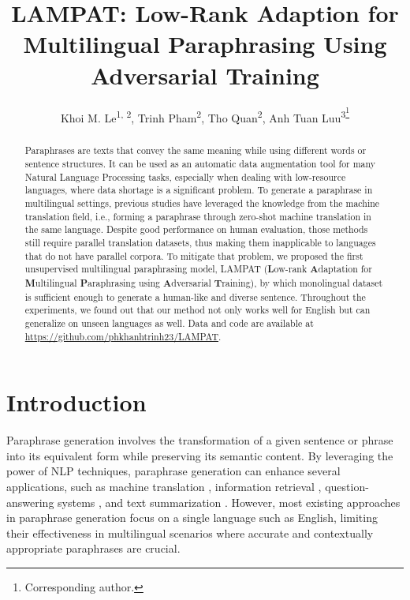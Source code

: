 \documentclass[letterpaper]{article} %
\title{LAMPAT: Low-Rank Adaption for Multilingual Paraphrasing Using Adversarial Training}
\author{
    Khoi M. Le\textsuperscript{\rm 1, \rm 2}\equalcontrib,
    Trinh Pham\textsuperscript{\rm 2}\equalcontrib,
    Tho Quan\textsuperscript{\rm 2},
    Anh Tuan Luu\textsuperscript{\rm 3\thanks{Corresponding author.}}
}
\begin{document}
\maketitle

\begin{abstract}
Paraphrases are texts that convey the same meaning while using different words or sentence structures. It can be used as an automatic data augmentation tool for many Natural Language Processing tasks, especially when dealing with low-resource languages, where data shortage is a significant problem. To generate a paraphrase in multilingual settings, previous studies have leveraged the knowledge from the machine translation field, i.e., forming a paraphrase through zero-shot machine translation in the same language. Despite good performance on human evaluation, those methods still require parallel translation datasets, thus making them inapplicable to languages that do not have parallel corpora. To mitigate that problem, we proposed the first unsupervised multilingual paraphrasing model, LAMPAT (\textbf{L}ow-rank \textbf{A}daptation for \textbf{M}ultilingual \textbf{P}araphrasing using \textbf{A}dversarial \textbf{T}raining), by which monolingual dataset is sufficient enough to generate a human-like and diverse sentence. Throughout the experiments, we found out that our method not only works well for English but can generalize on unseen languages as well. Data and code are available at \url{https://github.com/phkhanhtrinh23/LAMPAT}. %
\end{abstract}

\section{Introduction}

Paraphrase generation involves the transformation of a given sentence or phrase into its equivalent form while preserving its semantic content. By leveraging the power of NLP techniques, paraphrase generation can enhance several applications, such as machine translation \citep{freitag-etal-2020-human}, information retrieval \citep{NEURIPS2020_d6f1dd03}, question-answering systems \citep{gan-ng-2019-improving}, and text summarization \citep{Cao2017}. However, most existing approaches in paraphrase generation focus on a single language such as English, limiting their effectiveness in multilingual scenarios where accurate and contextually appropriate paraphrases are crucial.
\end{document}
